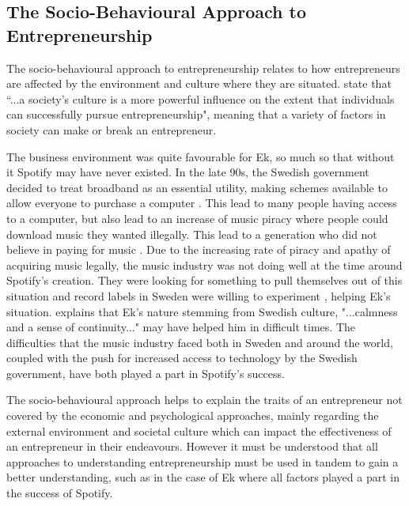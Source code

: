 \subsection{The Socio-Behavioural Approach to Entrepreneurship}
The socio-behavioural approach to entrepreneurship relates to how entrepreneurs are affected by the environment and culture where they are situated. \textcite[][17]{deakins2012} state that ``...a society's culture is a more powerful influence on the extent that individuals can successfully pursue entrepreneurship", meaning that a variety of factors in society can make or break an entrepreneur. 
\par
The business environment was quite favourable for Ek, so much so that without it Spotify may have never existed. In the late 90s, the Swedish government decided to treat broadband as an essential utility, making schemes available to allow everyone to purchase a computer \parencite{guardian_save_or_destroy}. This lead to many people having access to a computer, but also lead to an increase of music piracy where people could download music they wanted illegally. This lead to a generation who did not believe in paying for music \parencite{bertoni2012}. Due to the increasing rate of piracy and apathy of acquiring music legally, the music industry was not doing well at the time around Spotify's creation. They were looking for something to pull themselves out of this situation and record labels in Sweden were willing to experiment \parencite{ft_spotify}, helping Ek's situation. \textcite{ft_spotify} explains that Ek's nature stemming from Swedish culture, "...calmness and a sense of continuity..." may have helped him in difficult times. The difficulties that the music industry faced both in Sweden and around the world, coupled with the push for increased access to technology by the Swedish government, have both played a part in Spotify's success.
\par
The socio-behavioural approach helps to explain the traits of an entrepreneur not covered by the economic and psychological approaches, mainly regarding the external environment and societal culture which can impact the effectiveness of an entrepreneur in their endeavours. However it must be understood that all approaches to understanding entrepreneurship must be used in tandem to gain a better understanding, such as in the case of Ek where all factors played a part in the success of Spotify.
